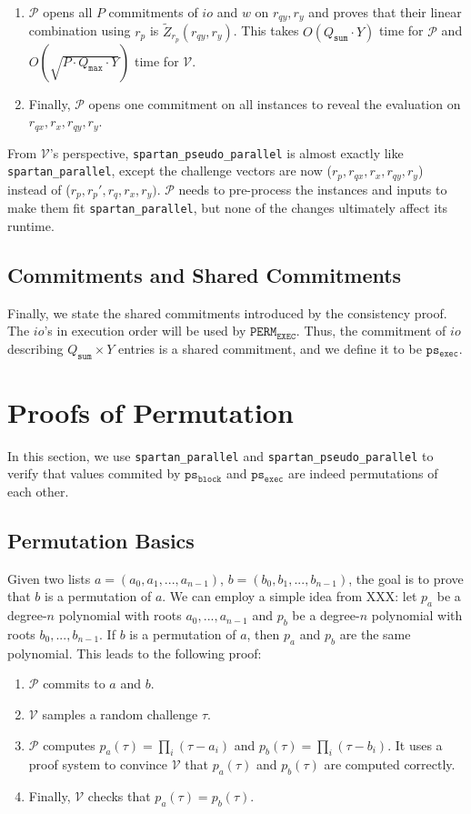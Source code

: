\documentclass{article}
\newcommand{\red}[1] {\color{red}#1\color{black}}
\newcommand{\code}{\texttt}
\newcommand{\Qsum}{Q_{\mathtt{sum}}}
\newcommand{\Qmax}{Q_{\mathtt{max}}}
\renewcommand{\P}{\mathcal{P}}
\newcommand{\V}{\mathcal{V}}
\newcommand{\Z}{\widetilde{Z}}
\newcommand{\PERME}{\mathtt{PERM_{EXEC}}}
\newcommand{\psb}{\mathtt{ps_{block}}}
\newcommand{\pse}{\mathtt{ps_{exec}}}
\begin{document}
\begin{enumerate}
    \item $\P$ opens all $P$ commitments of $io$ and $w$ on $r_{qy}, r_y$ and proves that their linear combination using $r_p$ is $\Z_{r_p}(r_{qy}, r_y)$. This takes $O(\Qsum\cdot Y)$ time for $\P$ and $O(\sqrt{P\cdot \Qmax\cdot Y})$ time for $\V$.
    \item Finally, $\P$ opens one commitment on all instances to reveal the evaluation on $r_{qx}, r_x, r_{qy}, r_y$.
\end{enumerate}
From $\V$'s perspective, \code{spartan\_pseudo\_parallel} is almost exactly like \code{spartan\_parallel}, except the challenge vectors are now ($r_p, r_{qx}, r_x, r_{qy}, r_y$) instead of ($r_p, r_p', r_q, r_x, r_y)$. $\P$ needs to pre-process the instances and inputs to make them fit \code{spartan\_parallel}, but none of the changes ultimately affect its runtime.

\subsection{Commitments and Shared Commitments}

Finally, we state the shared commitments introduced by the consistency proof. The $io$'s in execution order will be used by $\PERME$. Thus, the commitment of $io$ describing $\Qsum \times Y$ entries is a shared commitment, and we define it to be $\pse$.


\section{Proofs of Permutation}\label{sec:permutation}

In this section, we use \code{spartan\_parallel} and \code{spartan\_pseudo\_parallel} to verify that values commited by $\psb$ and $\pse$ are indeed permutations of each other. 

\subsection{Permutation Basics}

Given two lists $a = (a_0, a_1, ..., a_{n-1})$, $b = (b_0, b_1, ..., b_{n-1})$, the goal is to prove that $b$ is a permutation of $a$. We can employ a simple idea from \red{XXX}: let $p_a$ be a degree-$n$ polynomial with roots $a_0, ..., a_{n-1}$ and $p_b$ be a degree-$n$ polynomial with roots $b_0, ..., b_{n-1}$. If $b$ is a permutation of $a$, then $p_a$ and $p_b$ are the same polynomial. This leads to the following proof:
\begin{enumerate}
    \item $\P$ commits to $a$ and $b$.
    \item $\V$ samples a random challenge $\tau$.
    \item $\P$ computes $p_a(\tau) = \prod_i (\tau - a_i)$ and $p_b(\tau) = \prod_i (\tau - b_i)$. It uses a proof system to convince $\V$ that $p_a(\tau)$ and $p_b(\tau)$ are computed correctly.
    \item Finally, $\V$ checks that $p_a(\tau) = p_b(\tau)$.
\end{enumerate} 
\end{document}
